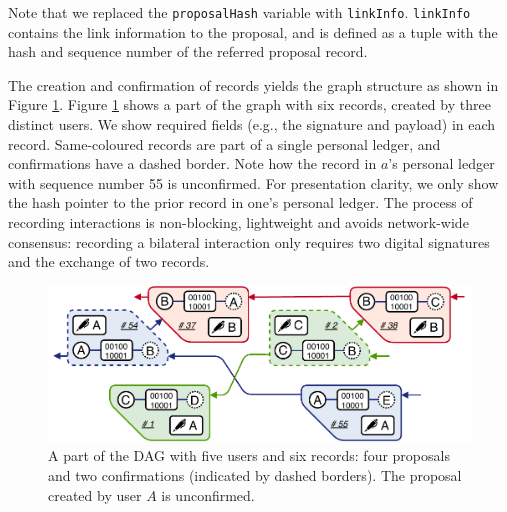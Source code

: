 Note that we replaced the \texttt{proposalHash} variable with \texttt{linkInfo}.
\texttt{linkInfo} contains the link information to the proposal, and is defined as a tuple with the hash and sequence number of the referred proposal record.

The creation and confirmation of records yields the graph structure as shown in Figure \ref{fig:fullchain}.
Figure \ref{fig:fullchain} shows a part of the \ModelName{} graph with six records, created by three distinct users.
We show required fields (e.g., the signature and payload) in each record.
Same-coloured records are part of a single personal ledger, and confirmations have a dashed border.
Note how the record in $ a $'s personal ledger with sequence number 55 is unconfirmed.
For presentation clarity, we only show the hash pointer to the prior record in one’s personal ledger.
The process of recording interactions is non-blocking, lightweight and avoids network-wide consensus: recording a bilateral interaction only requires two digital signatures and the exchange of two records.


\begin{figure}[t]
	\centering
	\includegraphics[width=.9\linewidth]{trustchain/assets/fullchain}
	\caption{A part of the \ModelName{} DAG with five users and six records: four proposals and two confirmations (indicated by dashed borders). The proposal created by user $ A $ is unconfirmed.}
	\label{fig:fullchain}
\end{figure}

